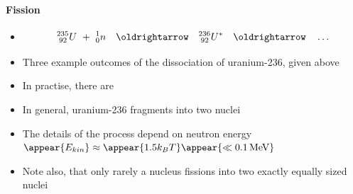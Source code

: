 \begin{frame}
\frametitle{\texorpdfstring{\culine[\sectiontitleulinecolor]{\sectiontitle}}{\sectiontitle} }
\framesubtitle{Fission}

\begin{itemize}
\item[] \[
{ }_{\;92}^{235} U ~ + ~ { }_{0}^{1} n \quad \oldrightarrow \quad{ }_{\;92}^{236} U^{*} \quad \oldrightarrow \quad \ldots
\]
	\item Three example outcomes of the dissociation of uranium-236, given above 
	
	\item %
	In practise, there are  %
	
	\item In general, uranium-236 fragments into two nuclei
	
	\item  The details of the process depend on neutron energy \appear{(}$\appear{E_{kin}} \approx \appear{1.5 k_B T} \appear{\ll 0.1 \text{\,MeV}}$\appear{)}  
	
	\item Note also, that only rarely a nucleus fissions into two exactly equally sized nuclei

\end{itemize}


\endofslide 
\end{frame}

